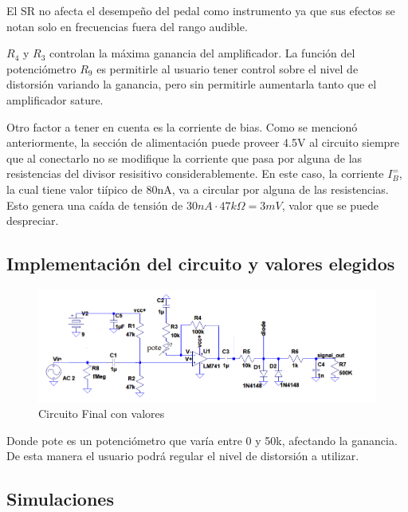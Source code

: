 \documentclass[../../main.tex]{subfiles}
\begin{document}
El SR no afecta el desempe\~no del pedal como instrumento ya que sus efectos se notan solo en frecuencias fuera del rango audible.


$R_4$ y $R_3$ controlan la m\'axima ganancia del amplificador. La funci\'on del potenci\'ometro $R_9$ es permitirle al usuario tener control sobre el nivel de distorsi\'on variando la ganancia, pero sin permitirle aumentarla tanto que el amplificador sature.

Otro factor a tener en cuenta es la corriente de bias. Como se mencion\'o anteriormente, la secci\'on de alimentaci\'on puede proveer 4.5V al circuito siempre que al conectarlo no se modifique la corriente que pasa por alguna de las resistencias del divisor resisitivo considerablemente. En este caso, la corriente $I_B^=$, la cual tiene valor ti\'ipico de 80nA, va a circular por alguna de las resistencias. Esto genera una ca\'ida de tensi\'on de $30nA\cdot 47k\Omega = 3mV$, valor que se puede despreciar.


\subsection{Implementación del circuito y valores elegidos}
\begin{figure}[H]
	\centering
	\includegraphics[scale=1]{imagenes/circuito_final.png}
	\caption{Circuito Final con valores}
	\label{fig:ej5_circuito_final}
\end{figure}

Donde pote es un potenciómetro que varía entre 0 y 50k, afectando la ganancia. De esta manera el usuario podrá regular el nivel de distorsión a utilizar.

\subsection{Simulaciones}
\end{document}

